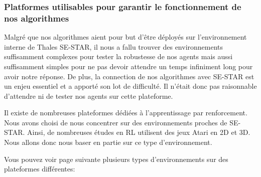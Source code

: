 \subsubsection{Platformes utilisables pour garantir le fonctionnement de nos algorithmes}
\label{sssec:benchmark}
Malgré que nos algorithmes aient pour but d'être déployés sur l'environnement interne de Thales SE-STAR, il nous a fallu trouver des environnements suffisamment complexes pour tester la robustesse de nos agents mais aussi suffisamment simples pour ne pas devoir attendre un temps infiniment long pour avoir notre réponse. De plus, la connection de nos algorithmes avec SE-STAR est un enjeu essentiel et a apporté son lot de difficulté. Il n'était donc pas raisonnable d'attendre ni de tester nos agents sur cette plateforme.

Il existe de nombreuses plateformes dédiées à l'apprentissage par renforcement. Nous avons choisi de nous concentrer sur des environnements proches de SE-STAR. Ainsi, de nombreuses études en \gls{RL} utilisent des jeux Atari en 2D et 3D. Nous allons donc nous baser en partie sur ce type d'environnement.

Vous pouvez voir page suivante plusieurs types d'environnements sur des plateformes différentes:

